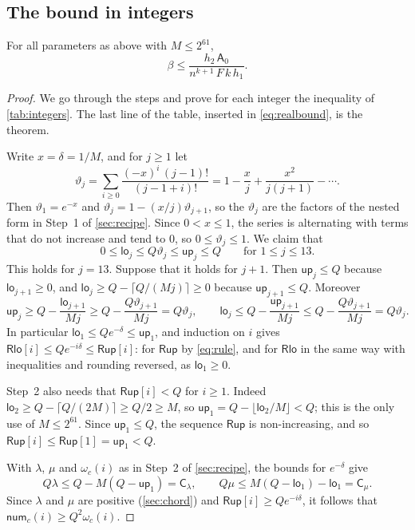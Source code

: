 \subsection{The bound in integers}

\begin{thm}\label{thm:integers}
For all parameters as above with $M\le2^{61}$,
\[
\beta\le\frac{h_2\,\mathsf{A}_0}{n^{k+1}\,F\,k\,h_1}.
\]
\end{thm}

\begin{proof}
We go through the steps and prove for each integer the inequality of \cref{tab:integers}. The last line of the table, inserted in \eqref{eq:realbound}, is the theorem.

 Write $x=\delta=1/M$, and for $j\ge1$ let
\[
\vartheta_j=\sum_{i\ge0}\frac{(-x)^i\,(j-1)!}{(j-1+i)!}=1-\frac{x}{j}+\frac{x^2}{j(j+1)}-\cdots .
\]
Then $\vartheta_1=e^{-x}$ and $\vartheta_j=1-(x/j)\vartheta_{j+1}$, so the $\vartheta_j$ are the factors of the nested form in Step~1 of \cref{sec:recipe}. Since $0<x\le1$, the series is alternating with terms that do not increase and tend to $0$, so $0\le\vartheta_j\le1$. We claim that
\[
0\le\mathsf{lo}_j\le Q\vartheta_j\le\mathsf{up}_j\le Q\qquad\text{for }1\le j\le13 .
\]
This holds for $j=13$. Suppose that it holds for $j+1$. Then $\mathsf{up}_j\le Q$ because $\mathsf{lo}_{j+1}\ge0$, and \mbox{$\mathsf{lo}_j\ge Q-\lceil Q/(Mj)\rceil\ge0$} because $\mathsf{up}_{j+1}\le Q$. Moreover
\[
\mathsf{up}_j\ge Q-\frac{\mathsf{lo}_{j+1}}{Mj}\ge Q-\frac{Q\vartheta_{j+1}}{Mj}=Q\vartheta_j,\qquad
\mathsf{lo}_j\le Q-\frac{\mathsf{up}_{j+1}}{Mj}\le Q-\frac{Q\vartheta_{j+1}}{Mj}=Q\vartheta_j .
\]
In particular $\mathsf{lo}_1\le Qe^{-\delta}\le\mathsf{up}_1$, and induction on $i$ gives $\mathsf{Rlo}[i]\le Qe^{-i\delta}\le\mathsf{Rup}[i]$: for $\mathsf{Rup}$ by \eqref{eq:rule}, and for $\mathsf{Rlo}$ in the same way with inequalities and rounding reversed, as $\mathsf{lo}_1\ge0$.

Step~2 also needs that $\mathsf{Rup}[i]<Q$ for $i\ge1$. Indeed $\mathsf{lo}_2\ge Q-\lceil Q/(2M)\rceil\ge Q/2\ge M$, so $\mathsf{up}_1=Q-\lfloor\mathsf{lo}_2/M\rfloor<Q$; this is the only use of $M\le2^{61}$. Since $\mathsf{up}_1\le Q$, the sequence $\mathsf{Rup}$ is non-increasing, and so $\mathsf{Rup}[i]\le\mathsf{Rup}[1]=\mathsf{up}_1<Q$.

 With $\lambda$, $\mu$ and $\omega_c(i)$ as in Step~2 of \cref{sec:recipe}, the bounds for $e^{-\delta}$ give
\[
Q\lambda\le Q-M(Q-\mathsf{up}_1)=\mathsf{C}_\lambda,\qquad Q\mu\le M(Q-\mathsf{lo}_1)-\mathsf{lo}_1=\mathsf{C}_\mu .
\]
Since $\lambda$ and $\mu$ are positive (\cref{sec:chord}) and $\mathsf{Rup}[i]\ge Qe^{-i\delta}$, it follows that $\mathsf{num}_c(i)\ge Q^2\omega_c(i)$.


\end{proof}
